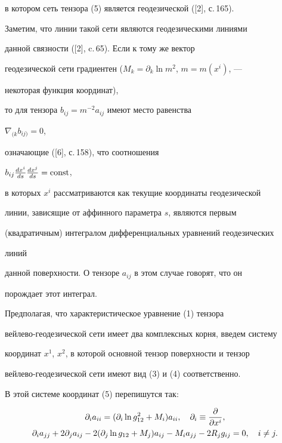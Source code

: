 в котором сеть тензора (5) является геодезической ([2], с.\,165). 


Заметим, что линии такой сети являются геодезическими линиями 


данной связности ([2], c.\,65). Если к тому же вектор  


геодезической сети градиентен ($M_k=\partial_k\ln m^2$, $m=m(x^i)$, --- 


некоторая функция координат), 


то для тензора $b_{ij}=m^{-2}a_{ij}$ имеют место равенства 


$\nabla_{(k}b_{ij)}=0$, 


означающие ([6], с.\,158), что соотношения 


$b_{ij}\frac{dx^i}{ds}\frac{dx^j}{ds}=\operatorname{const}$, 


в которых $x^i$ рассматриваются как текущие координаты геодезической 


линии, зависящие от аффинного параметра $s$, являются первым  


(квадратичным) интегралом дифференциальных уравнений геодезических 


линий 


данной поверхности. О тензоре $a_{ij}$ в этом случае говорят, что он  


порождает этот интеграл. 


 


Предполагая, что характеристическое уравнение (1) тензора 


вейлево-геодезической сети имеет два комплексных корня, введем систему 


координат $x^1$, $x^2$, в которой основной тензор поверхности и тензор 


вейлево-геодезической сети имеют вид (3) и (4) соответственно. 


В этой системе координат (5) перепишутся так: 


\begin{gather} 


\partial_i a_{ii}=(\partial_i\ln g^2_{12}+M_i)a_{ii}, 


\quad \partial_i\equiv\frac{\partial}{\partial x^i},\\ 


%


\partial_i a_{jj}+2\partial_j a_{ij}


-2(\partial_j\ln g_{12}+M_j)a_{ij}-M_i a_{jj}- 


2R_j g_{ij}=0,\quad i\ne j.\notag 


\end{gather} 


